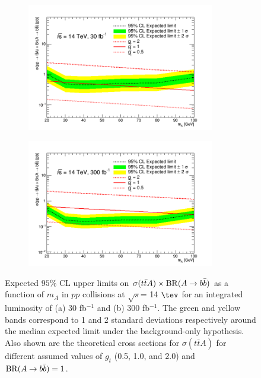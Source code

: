 \begin{figure}[htbp!]
\begin{subfigure}{0.5\textwidth}
  \centering
  \includegraphics[width=0.9\textwidth]{figures/ttA/limit_30fb.png}
  \caption{}
  \label{}
\end{subfigure}
\begin{subfigure}{0.5\textwidth}
  \centering
  \includegraphics[width=0.9\textwidth]{figures/ttA/limit_300fb.png}
  \caption{}
  \label{}
\end{subfigure}
\captionsetup{width=0.85\textwidth} \caption{\small Expected $95\%$ CL upper limits on $\sigma(t\bar{t}A)\times {\rm BR}(A\to b\bar{b})$ as a function of $m_{A}$  in $pp$ collisions at $\sqrt{s}$= 14 $\tev$ for an integrated luminosity of (a) 30 fb$^{-1}$ and (b) 300 fb$^{-1}$.  The green and yellow bands correspond to 1 and 2 standard deviations respectively around the median expected limit under the background-only hypothesis.  Also shown are the theoretical cross sections for $\sigma(t\bar{t}A)$ for different assumed values of $g_{t}$ (0.5, 1.0, and 2.0) and ${\rm BR}(A\to b \bar{b})=1$.}
\label{sec:ttA:fig:limit}
\end{figure}


